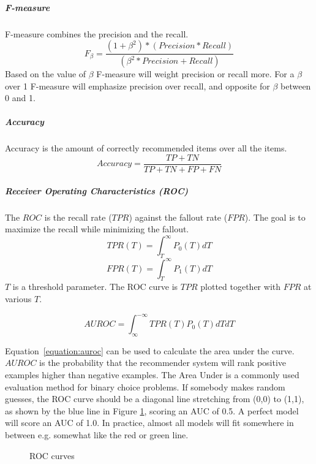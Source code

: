 \subparagraph{F-measure}
F-measure combines the precision and the recall.
\begin{equation}
    F_\beta = \frac{(1 + \beta^2) * (Precision * Recall)}{(\beta^2 * Precision + Recall)}
    \label{equation:f-measure}
\end{equation}
Based on the value of $\beta$ F-measure will weight precision or recall more. For a $\beta$ over 1 F-measure will emphasize precision over recall, and opposite for $\beta$ between 0 and 1.

\subparagraph{Accuracy}
Accuracy is the amount of correctly recommended items over all the items.
\begin{equation}
    Accuracy = \frac{TP+TN}{TP+TN+FP+FN}
    \label{equation:accuracy}
\end{equation}

\subparagraph{Receiver Operating Characteristics (ROC)}
The $ROC$ is the recall rate ($TPR$) against the fallout rate ($FPR$).
The goal is to maximize the recall while minimizing the fallout.
\begin{equation}
    TPR(T) = \int_T^\infty P_0(T)dT
    \label{equation:tpr}
\end{equation}
\begin{equation}
    FPR(T) = \int_T^\infty P_1(T)dT
    \label{equation:fpr}
\end{equation}
$T$ is a threshold parameter.
The ROC curve is $TPR$ plotted together with $FPR$ at various $T$.

\begin{equation}
    AUROC = \int_\infty^{-\infty} TPR(T)P_0(T)dTdT
    \label{equation:auroc}
\end{equation}

Equation~\ref{equation:auroc} can be used to calculate the area under the
curve.  $AUROC$ is the probability that the recommender system will rank
positive examples higher than negative examples.  The Area Under is a commonly
used evaluation method for binary choice problems. If somebody makes random
guesses, the ROC curve should be a diagonal line stretching from (0,0) to
(1,1), as shown by the blue line in Figure \ref{fig:aucroc}, scoring an AUC of
0.5. A perfect model will score an AUC of 1.0. In practice, almost all models
will fit somewhere in between e.g. somewhat like the red or green line.

\begin{figure}[H]
\label{fig:aucroc}
  \centering
    \caption{ROC curves}
\end{figure}

